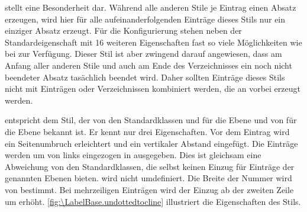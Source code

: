 \begin{description}
  stellt eine Besonderheit dar. Während alle anderen Stile je Eintrag einen
  Absatz
  erzeugen, wird hier für alle aufeinanderfolgenden Einträge dieses Stils nur
  ein einziger Absatz erzeugt.  Für die Konfigurierung stehen neben der
  Standardeigenschaft  mit 16 weiteren Eigenschaften fast so
  viele Möglichkeiten wie bei  zur Verfügung. Dieser Stil ist
  aber zwingend darauf angewiesen, dass am Anfang aller anderen Stile und auch
  am Ende des Verzeichnisses ein noch nicht beendeter Absatz tasächlich
  beendet wird. Daher sollten Einträge dieses Stils nicht mit Einträgen oder
  Verzeichnissen kombiniert werden, die an  vorbei erzeugt
  werden.
\item[\PValue{undottedtocline}] entspricht dem Stil, der von den
  Standardklassen  und  für die Ebene
   und von  für die Ebene 
  bekannt ist. Er kennt nur drei Eigenschaften.
  Vor dem Eintrag wird ein Seitenumbruch erleichtert und ein vertikaler
  Abstand eingefügt. Die Einträge werden um  von links
  eingezogen in  ausgegeben. Dies ist gleichsam eine
  Abweichung von den Standardklassen, die selbst keinen Einzug für Einträge
  der genannten Ebenen bieten.  wird nicht
  umdefiniert. Die Breite der Nummer wird von  bestimmt. Bei
  mehrzeiligen Einträgen wird der Einzug ab der zweiten Zeile um
   erhöht. \autoref{fig:\LabelBase.undottedtocline} illustriert
  die Eigenschaften des Stils.
  \begin{figure}
    \centering
\end{figure}
\end{description}
